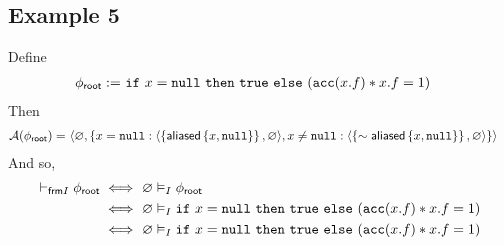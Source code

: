 \subsection*{Example 5}

Define
\begin{align*}
\phiroot := & \
\cif \ x = \cnull \ \cthen \ \ctrue \ \celse \ (\cacc(x.f) \ast x.f = 1)
\end{align*}
Then
\begin{align*}
\A(\phiroot) = & \
\context{\empty}{\set{
  x = \cnull: \context{\set{ \aliased\set{x, \cnull} }}{\empty},
  x \neq \cnull: \context{\set{ \pnot\aliased\set{x, \cnull} }}{\empty}
}}
\end{align*}
And so,
\begin{align*}
\selfframing \phiroot
\iff & \
\empty \frames \phiroot
\\ \iff & \
\empty
\frames
\cif \ x = \cnull \ \cthen \ \ctrue \ \celse \ (\cacc(x.f) \ast x.f = 1)
\\ \iff & \
\empty
\frames
\cif \ x = \cnull \ \cthen \ \ctrue \ \celse \ (\cacc(x.f) \ast x.f = 1)
\end{align*}

%
